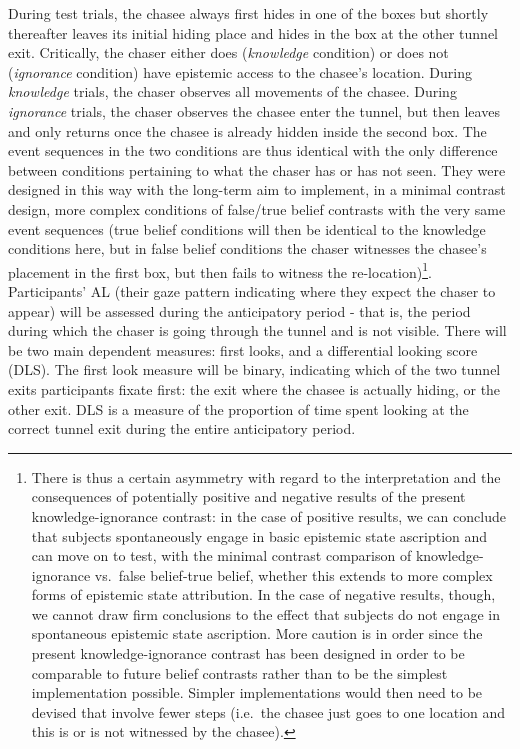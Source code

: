 \documentclass[
  english,
  man,floatsintext]{apa6}
\begin{document}
During test trials, the chasee always first hides in one of the boxes but shortly thereafter leaves its initial hiding place and hides in the box at the other tunnel exit. Critically, the chaser either does (\emph{knowledge} condition) or does not (\emph{ignorance} condition) have epistemic access to the chasee's location. During \emph{knowledge} trials, the chaser observes all movements of the chasee. During \emph{ignorance} trials, the chaser observes the chasee enter the tunnel, but then leaves and only returns once the chasee is already hidden inside the second box. The event sequences in the two conditions are thus identical with the only difference between conditions pertaining to what the chaser has or has not seen. They were designed in this way with the long-term aim to implement, in a minimal contrast design, more complex conditions of false/true belief contrasts with the very same event sequences (true belief conditions will then be identical to the knowledge conditions here, but in false belief conditions the chaser witnesses the chasee's placement in the first box, but then fails to witness the re-location)\footnote{There is thus a certain asymmetry with regard to the interpretation and the consequences of potentially positive and negative results of the present knowledge-ignorance contrast: in the case of positive results, we can conclude that subjects spontaneously engage in basic epistemic state ascription and can move on to test, with the minimal contrast comparison of knowledge-ignorance vs.~false belief-true belief, whether this extends to more complex forms of epistemic state attribution. In the case of negative results, though, we cannot draw firm conclusions to the effect that subjects do not engage in spontaneous epistemic state ascription. More caution is in order since the present knowledge-ignorance contrast has been designed in order to be comparable to future belief contrasts rather than to be the simplest implementation possible. Simpler implementations would then need to be devised that involve fewer steps (i.e.~the chasee just goes to one location and this is or is not witnessed by the chasee).}.
Participants' AL (their gaze pattern indicating where they expect the chaser to appear) will be assessed during the anticipatory period - that is, the period during which the chaser is going through the tunnel and is not visible. There will be two main dependent measures: first looks, and a differential looking score (DLS). The first look measure will be binary, indicating which of the two tunnel exits participants fixate first: the exit where the chasee is actually hiding, or the other exit. DLS is a measure of the proportion of time spent looking at the correct tunnel exit during the entire anticipatory period.
\end{document}
